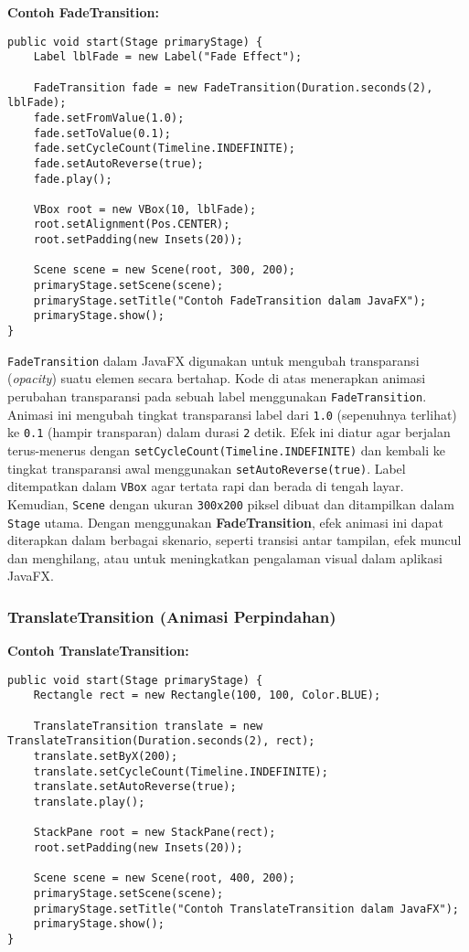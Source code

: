 \textbf{Contoh FadeTransition:}
\begin{lstlisting}[style=JavaStyle, caption=Mengubah transparansi elemen]
public void start(Stage primaryStage) {
	Label lblFade = new Label("Fade Effect");
	
	FadeTransition fade = new FadeTransition(Duration.seconds(2), lblFade);
	fade.setFromValue(1.0);
	fade.setToValue(0.1);
	fade.setCycleCount(Timeline.INDEFINITE);
	fade.setAutoReverse(true);
	fade.play();
	
	VBox root = new VBox(10, lblFade);
	root.setAlignment(Pos.CENTER);
	root.setPadding(new Insets(20));
	
	Scene scene = new Scene(root, 300, 200);
	primaryStage.setScene(scene);
	primaryStage.setTitle("Contoh FadeTransition dalam JavaFX");
	primaryStage.show();
}
\end{lstlisting}

\texttt{FadeTransition} dalam JavaFX digunakan untuk mengubah transparansi (\textit{opacity}) suatu elemen secara bertahap. Kode di atas menerapkan animasi perubahan transparansi pada sebuah label menggunakan \texttt{FadeTransition}. Animasi ini mengubah tingkat transparansi label dari \texttt{1.0} (sepenuhnya terlihat) ke \texttt{0.1} (hampir transparan) dalam durasi \texttt{2} detik. Efek ini diatur agar berjalan terus-menerus dengan \texttt{setCycleCount(Timeline.INDEFINITE)} dan kembali ke tingkat transparansi awal menggunakan \texttt{setAutoReverse(true)}. Label ditempatkan dalam \texttt{VBox} agar tertata rapi dan berada di tengah layar. Kemudian, \texttt{Scene} dengan ukuran \texttt{300x200} piksel dibuat dan ditampilkan dalam \texttt{Stage} utama. Dengan menggunakan \textbf{FadeTransition}, efek animasi ini dapat diterapkan dalam berbagai skenario, seperti transisi antar tampilan, efek muncul dan menghilang, atau untuk meningkatkan pengalaman visual dalam aplikasi JavaFX.


\subsubsection{TranslateTransition (Animasi Perpindahan)}

\textbf{Contoh TranslateTransition:}
\begin{lstlisting}[style=JavaStyle, caption=Menggerakkan objek dalam JavaFX]
public void start(Stage primaryStage) {
	Rectangle rect = new Rectangle(100, 100, Color.BLUE);
	
	TranslateTransition translate = new TranslateTransition(Duration.seconds(2), rect);
	translate.setByX(200);
	translate.setCycleCount(Timeline.INDEFINITE);
	translate.setAutoReverse(true);
	translate.play();
	
	StackPane root = new StackPane(rect);
	root.setPadding(new Insets(20));
	
	Scene scene = new Scene(root, 400, 200);
	primaryStage.setScene(scene);
	primaryStage.setTitle("Contoh TranslateTransition dalam JavaFX");
	primaryStage.show();
}
\end{lstlisting}


